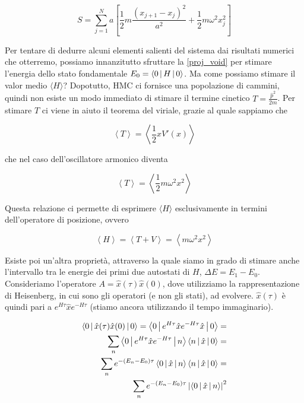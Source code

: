 \documentclass[11pt, a4paper]{article}
\begin{document}
\begin{equation}
  S = \sum_{j=1}^N a \left[
    \frac{1}{2} m \frac{\left(x_{j+1} - x_{j}\right)^2}{a^2} +
    \frac{1}{2} m \omega ^ 2 x_j^2
  \right]
\end{equation}

Per tentare di dedurre alcuni elementi salienti del sistema dai risultati numerici che otterremo, possiamo innanzitutto sfruttare la
\eqref{proj_void} per stimare l'energia dello stato fondamentale $E_0 = \Braket{0 | H | 0}$.
Ma come possiamo stimare il valor medio $\langle H \rangle$? Dopotutto, HMC ci fornisce una popolazione di cammini, quindi non esiste un modo immediato di stimare il termine cinetico $T = \frac{\hat{p}^2}{2m}$.
Per stimare $T$ ci viene in aiuto il teorema del viriale, grazie al quale sappiamo che

\begin{equation}
  \left\langle T \right\rangle =
  \left\langle \frac{1}{2} x V'(x) \right\rangle
\end{equation}

che nel caso dell'oscillatore armonico diventa

\begin{equation}
  \left\langle T \right\rangle = \left\langle \frac{1}{2} m \omega^2 x^2 \right\rangle
\end{equation}

Questa relazione ci permette di esprimere $\langle H \rangle$ esclusivamente in termini dell'operatore di posizione, ovvero

\begin{equation}
  \left\langle H \right\rangle =  \left\langle T + V \right\rangle =  \left\langle  m \omega^2 x^2 \right\rangle
\end{equation}

Esiste poi un'altra proprietà, attraverso la quale siamo in grado di stimare anche l'intervallo tra le energie dei primi due autostati di $H$, $\Delta E = E_1 - E_0$.
Consideriamo l'operatore $A = \hat{x}(\tau) \hat{x}(0)$, dove utilizziamo la rappresentazione di Heisenberg, in cui sono gli operatori (e non gli stati), ad evolvere.
$\hat{x}(\tau)$ è quindi pari a $e^{H \tau} \hat{x} e^{-H \tau}$ (stiamo ancora utilizzando il tempo immaginario).

\begin{align}
  \Braket{0 | \hat{x}(\tau) \hat{x}(0) | 0} = \Braket{0 | e^{H \tau} \hat{x} e^{-H \tau} \hat{x} | 0} = \\
  \sum_{n} \Braket{0 | e^{H \tau} \hat{x} e^{-H \tau} | n} \Braket{n | \hat{x} | 0} = \\
  \sum_{n}  e^{-\left(E_n - E_0\right) \tau} \Braket{0 | \hat{x}  | n} \Braket{n | \hat{x} | 0} = \\
  \sum_{n}  e^{-\left(E_n - E_0\right) \tau} \left| \Braket{0 | \hat{x}  | n} \right|^2  \label{deltae_prop_sum}
\end{align}
\end{document}
